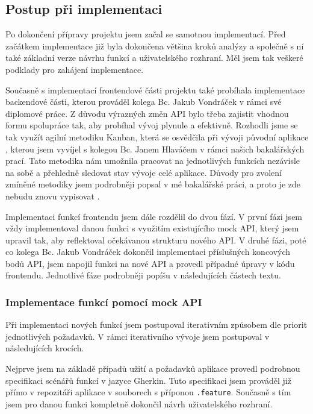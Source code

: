 \subsection{Postup při implementaci}

Po dokončení přípravy projektu jsem začal se samotnou implementací. Před začátkem implementace již byla dokončena většina kroků analýzy a společně s ní také základní verze návrhu funkcí a uživatelského rozhraní. Měl jsem tak veškeré podklady pro zahájení implementace.

Současně s implementací frontendové části projektu také probíhala implementace backendové části, kterou prováděl kolega Bc. Jakub Vondráček v rámci své diplomové práce. Z důvodu výrazných změn API bylo třeba zajistit vhodnou formu spolupráce tak, aby probíhal vývoj plynule a efektivně. Rozhodli jsme se tak využít agilní metodiku Kanban, která se osvědčila při vývoji původní aplikace \cite{Jenicek2024BachelorThesis}, kterou jsem vyvíjel s kolegou Bc. Janem Hlaváčem v rámci našich bakalářských prací. Tato metodika nám umožnila pracovat na jednotlivých funkcích nezávisle na sobě a přehledně sledovat stav vývoje celé aplikace. Důvody pro zvolení zmíněné metodiky jsem podrobněji popsal v mé bakalářské práci, a proto je zde nebudu znovu vypisovat \cite{Jenicek2024BachelorThesis}.

Implementaci funkcí frontendu jsem dále rozdělil do dvou fází. V první fázi jsem vždy implementoval danou funkci s využitím existujícího mock API, který jsem upravil tak, aby reflektoval očekávanou strukturu nového API. V druhé fázi, poté co kolega Bc. Jakub Vondráček dokončil implementaci příslušných koncových bodů API, jsem napojil funkci na nové API a provedl případné úpravy v kódu frontendu. Jednotlivé fáze podrobněji popíšu v následujících částech textu.

\subsubsection{Implementace funkcí pomocí mock API}

Při implementaci nových funkcí jsem postupoval iterativním způsobem dle priorit jednotlivých požadavků. V rámci iterativního vývoje jsem postupoval v následujících krocích.

Nejprve jsem na základě případů užití a požadavků aplikace provedl podrobnou specifikaci scénářů funkcí v jazyce Gherkin. Tuto specifikaci jsem prováděl již přímo v repozitáři aplikace v souborech s příponou \texttt{.feature}. Současně s tím jsem pro danou funkci kompletně dokončil návrh uživatelského rozhraní.

